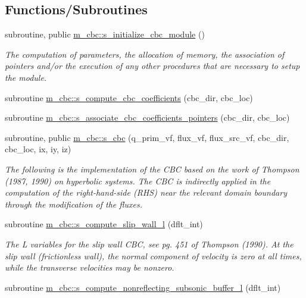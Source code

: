\subsection*{Functions/\+Subroutines}
\begin{DoxyCompactItemize}
\item 
subroutine, public \hyperlink{namespacem__cbc_a0afb287e68b0d1d970fd073849525c36}{m\+\_\+cbc\+::s\+\_\+initialize\+\_\+cbc\+\_\+module} ()
\begin{DoxyCompactList}\small\item\em The computation of parameters, the allocation of memory, the association of pointers and/or the execution of any other procedures that are necessary to setup the module. \end{DoxyCompactList}\item 
subroutine \hyperlink{namespacem__cbc_aee8ead62642bc2783deb6403a961679d}{m\+\_\+cbc\+::s\+\_\+compute\+\_\+cbc\+\_\+coefficients} (cbc\+\_\+dir, cbc\+\_\+loc)
\item 
subroutine \hyperlink{namespacem__cbc_a76e19dea2a654c9a7f311baa16ef118c}{m\+\_\+cbc\+::s\+\_\+associate\+\_\+cbc\+\_\+coefficients\+\_\+pointers} (cbc\+\_\+dir, cbc\+\_\+loc)
\item 
subroutine, public \hyperlink{namespacem__cbc_a72cc3ba5a0de327fae70742734e77492}{m\+\_\+cbc\+::s\+\_\+cbc} (q\+\_\+prim\+\_\+vf, flux\+\_\+vf, flux\+\_\+src\+\_\+vf, cbc\+\_\+dir, cbc\+\_\+loc, ix, iy, iz)
\begin{DoxyCompactList}\small\item\em The following is the implementation of the C\+BC based on the work of Thompson (1987, 1990) on hyperbolic systems. The C\+BC is indirectly applied in the computation of the right-\/hand-\/side (R\+HS) near the relevant domain boundary through the modification of the fluxes. \end{DoxyCompactList}\item 
subroutine \hyperlink{namespacem__cbc_ad51ac21554842928259732d09a7eaf51}{m\+\_\+cbc\+::s\+\_\+compute\+\_\+slip\+\_\+wall\+\_\+l} (dflt\+\_\+int)
\begin{DoxyCompactList}\small\item\em The L variables for the slip wall C\+BC, see pg. 451 of Thompson (1990). At the slip wall (frictionless wall), the normal component of velocity is zero at all times, while the transverse velocities may be nonzero. \end{DoxyCompactList}\item 
subroutine \hyperlink{namespacem__cbc_a39d803573d65c9c8ba7cc8b44b8053e1}{m\+\_\+cbc\+::s\+\_\+compute\+\_\+nonreflecting\+\_\+subsonic\+\_\+buffer\+\_\+l} (dflt\+\_\+int)

\end{DoxyCompactItemize}
